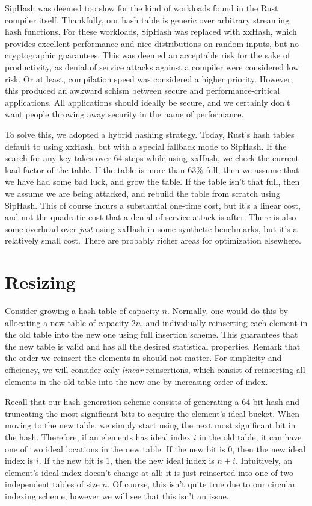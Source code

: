 \documentclass{cccg13}
\begin{document}
SipHash was deemed too slow for the kind of workloads found in the Rust
compiler itself. Thankfully, our hash table is generic over arbitrary
streaming hash functions. For these workloads, SipHash was replaced with
xxHash, which provides excellent performance and nice distributions on random
inputs, but no cryptographic guarantees. This was deemed an acceptable risk
for the sake of productivity, as denial of service attacks against a compiler
were considered low risk. Or at least, compilation speed was considered a
higher priority. However, this produced an awkward schism between secure and
performance-critical applications. All applications should ideally be secure,
and we certainly don't want people throwing away security in the name of
performance.

To solve this, we adopted a hybrid hashing strategy. Today, Rust's hash tables
default to using xxHash, but with a special fallback mode to SipHash. If the
search for any key takes over 64 steps while using xxHash, we check the
current load factor of the table. If the table is more than 63\% full, then we
assume that we have had some bad luck, and grow the table. If the table isn't
that full, then we assume we are being attacked, and rebuild the table from
scratch using SipHash. This of course incurs a substantial one-time cost, but
it's a linear cost, and not the quadratic cost that a denial of service attack
is after. There is also some overhead over \emph{just} using xxHash in some
synthetic benchmarks, but it's a relatively small cost. There are probably
richer areas for optimization elsewhere.





\section{Resizing}

Consider growing a hash table of capacity $n$. Normally, one would do this by
allocating a new table of capacity $2n$, and individually reinserting each
element in the old table into the new one using full insertion scheme. This
guarantees that the new table is valid and has all the desired statistical
properties. Remark that the order we reinsert the elements in should not
matter. For simplicity and efficiency, we will consider only \emph{linear}
reinsertions, which consist of reinserting all elements in the old table into
the new one by increasing order of index.

Recall that our hash generation scheme consists of generating a 64-bit hash
and truncating the most significant bits to acquire the element's ideal
bucket. When moving to the new table, we simply start using the next most
significant bit in the hash. Therefore, if an elements has ideal index $i$ in
the old table, it can have one of two ideal locations in the new table. If the
new bit is $0$, then the new ideal index is $i$. If the new bit is $1$, then
the new ideal index is $n + i$. Intuitively, an element's ideal index doesn't
change at all; it is just reinserted into one of two independent tables of
size $n$. Of course, this isn't quite true due to our circular indexing
scheme, however we will see that this isn't an issue.
\end{document}
